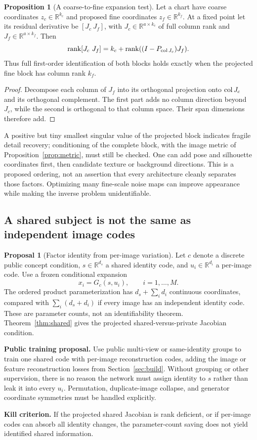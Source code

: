 \documentclass[11pt,a4paper]{article}
\theoremstyle{definition}
\newtheorem{proposition}[theorem]{Proposition}
\theoremstyle{definition}
\newtheorem{proposal}[theorem]{Proposal}
\theoremstyle{remark}\newtheorem{remark}[theorem]{Remark}
\newcommand{\R}{\mathbb R}\newcommand{\Prob}{\mathbb P}\newcommand{\E}{\mathbb E}
\begin{document}
\begin{proposition}[A coarse-to-fine expansion test]\label{prop:coarsefine}
Let a chart have coarse coordinates $z_c\in\R^{k_c}$ and proposed fine coordinates $z_f\in\R^{k_f}$. At a fixed point let its residual derivative be $[J_c\ J_f]$, with $J_c\in\R^{a\times k_c}$ of full column rank and $J_f\in\R^{a\times k_f}$. Then
\[
\operatorname{rank}[J_c\ J_f]
=k_c+\operatorname{rank}((I-P_{\operatorname{col} J_c})J_f).
\]
Thus full first-order identification of both blocks holds exactly when the projected fine block has column rank $k_f$.
\end{proposition}
\begin{proof}
Decompose each column of $J_f$ into its orthogonal projection onto $\operatorname{col} J_c$ and its orthogonal complement. The first part adds no column direction beyond $J_c$, while the second is orthogonal to that column space. Their span dimensions therefore add.
\end{proof}

A positive but tiny smallest singular value of the projected block indicates fragile detail recovery; conditioning of the complete block, with the image metric of Proposition~\ref{prop:metric}, must still be checked. One can add pose and silhouette coordinates first, then candidate texture or background directions. This is a proposed ordering, not an assertion that every architecture cleanly separates those factors. Optimizing many fine-scale noise maps can improve appearance while making the inverse problem unidentifiable.

\subsection{A shared subject is not the same as independent image codes}

\begin{proposal}[Factor identity from per-image variation]\label{pr:sharedbuild}
Let $c$ denote a discrete public concept condition, $s\in\R^{d_s}$ a shared identity code, and $u_i\in\R^{d_i}$ a per-image code. Use a frozen conditional expansion
\[
x_i=G_c(s,u_i),\qquad i=1,\ldots,M.
\]
The ordered product parameterization has $d_s+\sum_i d_i$ continuous coordinates, compared with $\sum_i(d_s+d_i)$ if every image has an independent identity code. These are parameter counts, not an identifiability theorem. Theorem~\ref{thm:shared} gives the projected shared-versus-private Jacobian condition.

\textbf{Public training proposal.} Use public multi-view or same-identity groups to train one shared code with per-image reconstruction codes, adding the image or feature reconstruction losses from Section~\ref{sec:build}. Without grouping or other supervision, there is no reason the network must assign identity to $s$ rather than leak it into every $u_i$. Permutation, duplicate-image collapse, and generator coordinate symmetries must be handled explicitly.

\textbf{Kill criterion.} If the projected shared Jacobian is rank deficient, or if per-image codes can absorb all identity changes, the parameter-count saving does not yield identified shared information.
\end{proposal}
\end{document}
